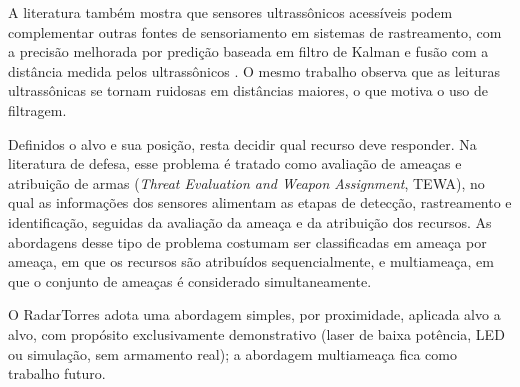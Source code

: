 \documentclass[12pt,a4paper]{article}
\begin{document}
A literatura também mostra que sensores ultrassônicos acessíveis podem complementar outras fontes
de sensoriamento em sistemas de rastreamento, com a precisão melhorada por predição baseada em
filtro de Kalman e fusão com a distância medida pelos ultrassônicos \cite{curbscan}. O mesmo trabalho observa
que as leituras ultrassônicas se tornam ruidosas em distâncias maiores, o que motiva o uso de
filtragem.

Definidos o alvo e sua posição, resta decidir qual recurso deve responder. Na literatura de defesa,
esse problema é tratado como avaliação de ameaças e atribuição de armas (\textit{Threat Evaluation
and Weapon Assignment}, TEWA), no qual as informações dos sensores alimentam as etapas de detecção,
rastreamento e identificação, seguidas da avaliação da ameaça e da atribuição dos recursos. As
abordagens desse tipo de problema costumam ser classificadas em ameaça por ameaça, em que os
recursos são atribuídos sequencialmente, e multiameaça, em que o conjunto de ameaças é considerado
simultaneamente.

O RadarTorres adota uma abordagem simples, por proximidade, aplicada alvo a alvo, com propósito
exclusivamente demonstrativo (laser de baixa potência, LED ou simulação, sem armamento real); a
abordagem multiameaça fica como trabalho futuro.
\end{document}
